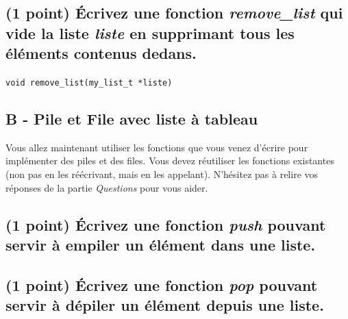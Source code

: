 \documentclass[11pt,a4paper]{article}
\begin{document}
\newpage

\subsection{(1 point) \'Ecrivez une fonction \og \textit{remove\_list} \fg{} qui vide la liste \textit{liste} en supprimant tous les éléments contenus dedans. }

\bigskip

\texttt{void remove\_list(my\_list\_t *liste)}

\begin{center}
\end{center}




\subsection*{B - Pile et File avec liste à tableau}

Vous allez maintenant utiliser les fonctions que vous venez d'écrire pour implémenter des piles et des files.
Vous devez réutiliser les fonctions existantes (non pas en les réécrivant, mais en les appelant).
N'hésitez pas à relire vos réponses de la partie \textit{Questions} pour vous aider.

\subsection{(1 point) \'Ecrivez une fonction \og \textit{push} \fg{} pouvant servir à empiler un élément dans une liste. }

\bigskip

\begin{center}
\end{center}

\newpage

\subsection{(1 point) \'Ecrivez une fonction \og \textit{pop} \fg{} pouvant servir à dépiler un élément depuis une liste. }

\bigskip

\begin{center}
\end{center}

\bigskip



\end{document}
